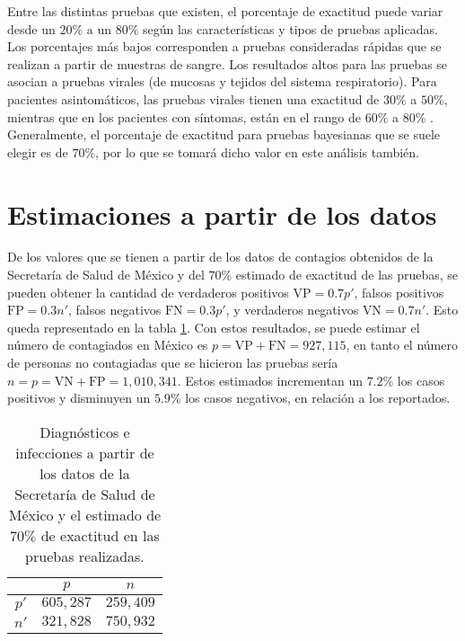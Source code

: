 \documentclass[paper=leter, fontsize=11pt]{scrartcl}
\numberwithin{equation}{section}		%
\numberwithin{figure}{section}			%
\numberwithin{table}{section}				%
\begin{document}
Entre las distintas pruebas que existen, el porcentaje de exactitud puede variar desde un $20\%$ a un $80\%$ según las características y tipos de pruebas aplicadas. Los porcentajes más bajos corresponden a pruebas consideradas rápidas que se realizan a partir de muestras de sangre. Los resultados altos para las pruebas se asocian a pruebas virales (de mucosas y tejidos del sistema respiratorio). Para pacientes asintomáticos, las pruebas virales tienen una exactitud de $30\%$ a $50\%$, mientras que en los pacientes con síntomas, están en el rango de $60\%$ a $80\%$ \citep{garcia2020, LisboaEA2516}. Generalmente, el porcentaje de exactitud para pruebas bayesianas que se suele elegir es de $70\%$, por lo que se tomará dicho valor en este análisis también.

\section{Estimaciones a partir de los datos}
De los valores que se tienen a partir de los datos de contagios obtenidos de la Secretaría de Salud de México y del $70\%$ estimado de exactitud de las pruebas, se pueden obtener la cantidad de verdaderos positivos $\text{VP} = 0.7 p'$, falsos positivos $\text{FP} = 0.3 n'$, falsos negativos $\text{FN} = 0.3 p'$, y verdaderos negativos $\text{VN} = 0.7 n'$. Esto queda representado en la tabla \ref{carac}. Con estos resultados, se puede estimar el número de contagiados en México es $p = \text{VP} + \text{FN} = 927, 115$, en tanto el número de personas no contagiadas que se hicieron las pruebas sería $n = p = \text{VN} + \text{FP} = 1,010,341$. Estos estimados incrementan un $7.2\%$ los casos positivos y disminuyen un $5.9\%$ los casos negativos, en relación a los reportados.

\begin{table}[]
    \centering
    \caption{Diagnósticos e infecciones a partir de los datos de la Secretaría de Salud de México y el estimado de $70\%$ de exactitud en las pruebas realizadas.}
    \begin{tabular}{c|c|c|}
    \cline{2-3}
                               & $p$       & $n$       \\ \hline
    \multicolumn{1}{|c|}{$p'$} & $605,287$ & $259,409$  \\ \hline
    \multicolumn{1}{|c|}{$n'$} & $321,828$ & $750,932$ \\ \hline
    \end{tabular}
    \label{carac}
\end{table}
\end{document}
